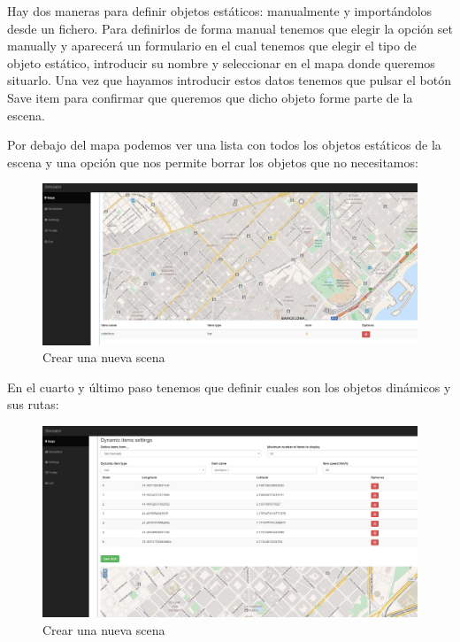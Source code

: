 Hay dos maneras para definir objetos estáticos: manualmente y importándolos desde un fichero. Para definirlos de forma manual tenemos que elegir la opción set manually y aparecerá un formulario en el cual tenemos que elegir el tipo de objeto estático, introducir su nombre y seleccionar en el mapa donde queremos situarlo. Una vez que hayamos introducir estos datos tenemos que pulsar el botón Save item para confirmar que queremos que dicho objeto forme parte de la escena.

Por debajo del mapa podemos ver una lista con todos los objetos estáticos de la escena y una opción que nos permite borrar los objetos que no necesitamos:

\begin{figure}[H]
	\centering\includegraphics[scale=0.25]{imagenes/capitulo9/crear-escena-3-2.jpg}
	\caption{Crear una nueva scena}
	\label{img:AddScena32}
\end{figure}

En el cuarto y último paso tenemos que definir cuales son los objetos dinámicos y sus rutas:

\begin{figure}[H]
	\centering\includegraphics[scale=0.25]{imagenes/capitulo9/crear-escena-4.jpg}
	\caption{Crear una nueva scena}
	\label{img:AddScena4}
\end{figure}

